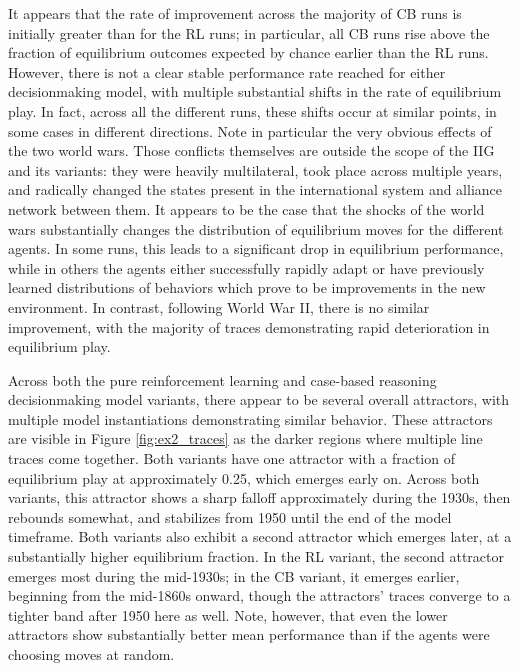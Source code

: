 It appears that the rate of improvement across the majority of CB runs is initially greater than for the RL runs; in particular, all CB runs rise above the fraction of equilibrium outcomes expected by chance earlier than the RL runs. However, there is not a clear stable performance rate reached for either decisionmaking model, with multiple substantial shifts in the rate of equilibrium play. In fact, across all the different runs, these shifts occur at similar points, in some cases in different directions. Note in particular the very obvious effects of the two world wars. Those conflicts themselves are outside the scope of the IIG and its variants: they were heavily multilateral, took place across multiple years, and radically changed the states present in the international system and alliance network between them. It appears to be the case that the shocks of the world wars substantially changes the distribution of equilibrium moves for the different agents. In some runs, this leads to a significant drop in equilibrium performance, while in others the agents either successfully rapidly adapt or have previously learned distributions of behaviors which prove to be improvements in the new environment. In contrast, following World War II, there is no similar improvement, with the majority of traces demonstrating rapid deterioration in equilibrium play. 

Across both the pure reinforcement learning and case-based reasoning decisionmaking model variants, there appear to be several overall attractors, with multiple model instantiations demonstrating similar behavior. These attractors are visible in Figure \ref{fig:ex2_traces} as the darker regions where multiple line traces come together. Both variants have one attractor with a fraction of equilibrium play at approximately 0.25, which emerges early on. Across both variants, this attractor shows a sharp falloff approximately during the 1930s, then rebounds somewhat, and stabilizes from 1950 until the end of the model timeframe. Both variants also exhibit a second attractor which emerges later, at a substantially higher equilibrium fraction. In the RL variant, the second attractor emerges most during the mid-1930s; in the CB variant, it emerges earlier, beginning from the mid-1860s onward, though the attractors' traces converge to a tighter band after 1950 here as well. Note, however, that even the lower attractors show substantially better mean performance than if the agents were choosing moves at random.

